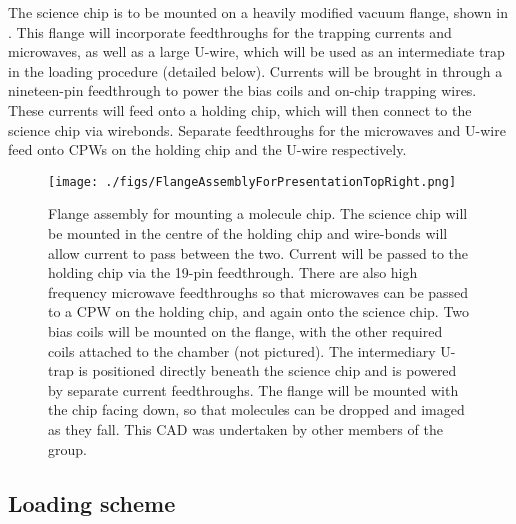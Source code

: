 The science chip is to be mounted on a heavily modified vacuum flange, shown in
. This flange will incorporate feedthroughs for
the trapping currents and microwaves, as well as a large U-wire, which will be
used as an intermediate trap in the loading procedure (detailed below). Currents
will be brought in through a nineteen-pin feedthrough  to power the bias coils
and on-chip trapping wires. These currents will feed onto a holding chip, which
will then connect to the science chip via wirebonds. Separate feedthroughs for
the microwaves and U-wire  feed onto CPWs on the
holding chip and the U-wire respectively.

\begin{figure}[ht]
  \texttt{[image: ./figs/FlangeAssemblyForPresentationTopRight.png]}
  \caption{
    Flange assembly for mounting a molecule chip. The science chip will be
    mounted in the centre of the holding chip and wire-bonds will allow current
    to pass between the two. Current will be passed to the holding chip via the
    19-pin feedthrough. There are also high frequency microwave feedthroughs so
    that microwaves can be passed to a CPW on the holding chip, and again onto
    the science chip. Two bias coils will be mounted on the flange, with the
    other required coils attached to the chamber (not pictured). The
    intermediary U-trap is positioned directly beneath the science chip and is
    powered by separate current feedthroughs. The flange will be mounted with
    the chip facing down, so that molecules can be dropped and imaged as they
    fall. This CAD was undertaken by other members of the group.
  }
  \label{experiment:fig:flange}
\end{figure}


\subsection{Loading scheme}
\label{experiment:loading}

